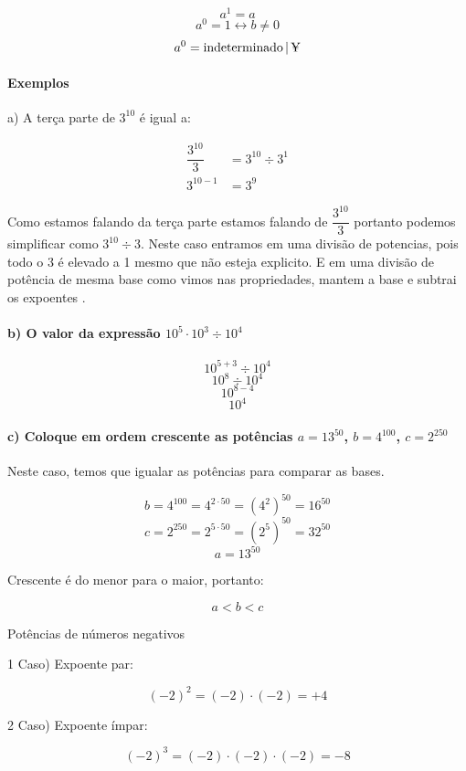 \documentclass[letterpaper]{book}
\begin{document}
\[
a^{1} = a
\]
\[
a^{0} = 1 \leftrightarrow b \neq 0
\]
\[
a^{0} = \text{indeterminado} \, | \, \text{\textyen}
\]

\paragraph{Exemplos}

a) A terça parte de \(3^{10}\) é igual a:

\begin{align}
\dfrac{3^{10}}{3} &= 3^{10} \div 3^{1} \\
3^{10-1} &= 3^{9}
\end{align}


Como estamos falando da terça parte estamos falando de \(\dfrac{3^{10}}{3}\) portanto podemos simplificar como \(3^{10} \div 3\). Neste caso entramos em uma divisão de potencias, pois todo o 3 é elevado a 1 mesmo que não esteja explicito. E em uma divisão de potência de mesma base como vimos nas propriedades, mantem a base e subtrai os expoentes
.

\vspace{0.5em}
\paragraph{b) O valor da expressão \(10^{5} \cdot 10^{3} \div 10^{4}\)}

\[
10^{5+3} \div 10^{4}
\]
\[
10^{8} \div 10^{4}
\]
\[
10^{8-4}
\]
\[
10^{4}
\]

\paragraph{c) Coloque em ordem crescente as potências \(a = 13^{50}\), \(b= 4^{100}\), \(c = 2^{250}\)}

Neste caso, temos que igualar as potências para comparar as bases.

\[
b = 4^{100} = 4^{2 \cdot 50} = (4^{2})^{50} = 16^{50}
\]
\[
c = 2^{250} = 2^{5 \cdot 50} = (2^{5})^{50} = 32^{50}
\]
\[
a = 13^{50}
\]

Crescente é do menor para o maior, portanto:

\[
a < b < c
\]

Potências de números negativos

1 Caso) Expoente par:

\[
(-2)^{2} = (-2) \cdot (-2) = +4
\]

2 Caso) Expoente ímpar:

\[
(-2)^{3} = (-2) \cdot (-2) \cdot (-2) = -8
\]
\end{document}
